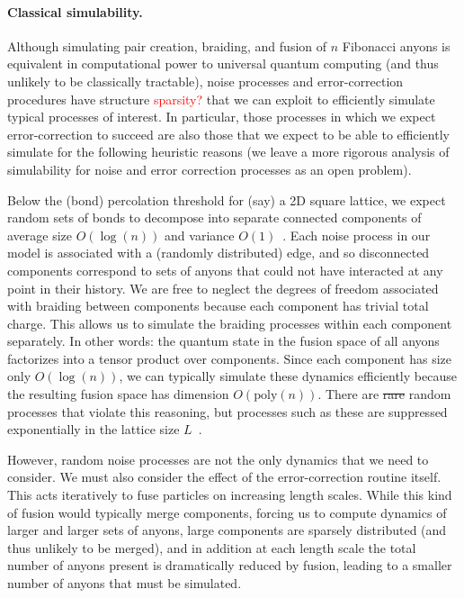 \documentclass[aps, prl, letterpaper, twocolumn, superscriptaddress, notitlepage, 10pt]{revtex4-1}
\newcommand{\dude}[1]{\textcolor{red}{#1}}
\begin{document}
\paragraph{Classical simulability.}

Although simulating pair creation, braiding, and fusion of $n$ Fibonacci anyons is equivalent 
in computational power to universal quantum computing (and thus unlikely to be classically 
tractable), noise processes and error-correction procedures have structure \dude{sparsity?} that we can 
exploit to efficiently simulate typical processes of interest. In particular, those 
processes in which we expect error-correction to succeed are also those that we expect to 
be able to efficiently simulate for the following heuristic reasons 
(we leave a more rigorous analysis of simulability for noise 
and error correction processes as an open problem).

Below the (bond) percolation threshold for (say) a 2D square lattice, we expect random sets of 
bonds to decompose into separate connected components 
of average size $O(\log(n))$ and variance $O(1)$~\cite{Bazant2000}.
Each noise process in our model is associated with a (randomly distributed) edge, and so 
disconnected components correspond to sets of anyons that could not have interacted at any 
point in their history. 
We are free to neglect the degrees of freedom associated with braiding between components 
because each component has trivial total charge.
This allows us to simulate the braiding processes within each component separately. 
In other words: the quantum state in the fusion space of all anyons factorizes into 
a tensor product over components. 
Since each 
component has size only $O(\log(n))$, we can typically simulate these dynamics efficiently 
because the resulting fusion space has dimension $O(\mathrm{poly}(n))$. There are \sout{rare}
random processes that violate this reasoning, but processes such as these are suppressed 
exponentially in the lattice size $L$~\cite{Grimmett1989}. 

However, random noise processes are not the only dynamics that we need to consider. We 
must also consider the effect of the error-correction routine itself. This acts iteratively to fuse 
particles on increasing length scales. While this kind of fusion would typically merge components, 
forcing us to compute dynamics of larger and larger sets of anyons, large components are sparsely distributed 
(and thus unlikely to be merged), and in addition at each length scale the total number of 
anyons present is dramatically reduced by fusion, leading to a smaller number of anyons that 
must be simulated.
\end{document}

